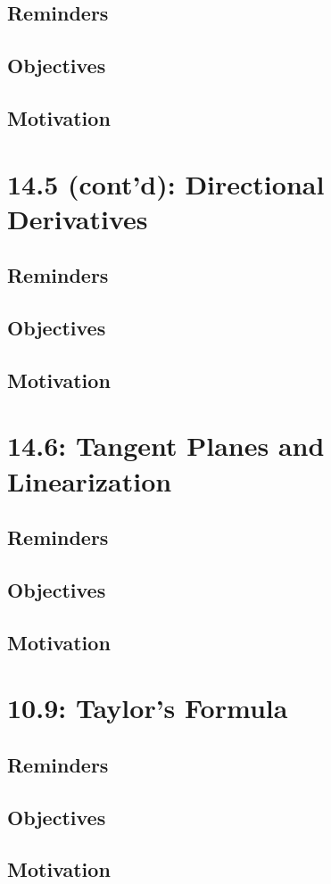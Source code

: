 \documentclass{report}
\begin{document}
\begin{sloppypar}
\section{Reminders}
\section{Objectives}
\section{Motivation}
\chapter{14.5 (cont'd): Directional Derivatives}
\section{Reminders}
\section{Objectives}
\section{Motivation}
\chapter{14.6: Tangent Planes and Linearization}
\section{Reminders}
\section{Objectives}
\section{Motivation}
\chapter{10.9: Taylor's Formula}
\section{Reminders}
\section{Objectives}
\section{Motivation}

\end{sloppypar}
\end{document}
